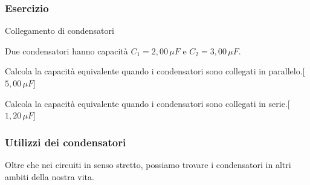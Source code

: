 \documentclass[]{beamer}
\theoremstyle{plain}
\begin{document}
\begin{frame}
\frametitle{Esercizio}
\begin{exampleblock}{Collegamento di condensatori}
  \small{
  Due condensatori hanno capacità $ C_1 = 2,00 \, \mu F $ e $ C_2 = 3,00 \, \mu F $.

  Calcola la capacità equivalente quando i condensatori sono collegati in parallelo.\hspace*{\fill}[$ 5,00 \, \mu F $]
  
  Calcola la capacità equivalente quando i condensatori sono collegati in serie.\hspace*{\fill}[$ 1,20 \, \mu F $]}
\end{exampleblock}
\end{frame}



\begin{frame}
\frametitle{Utilizzi dei condensatori}
Oltre che nei circuiti in senso stretto, possiamo trovare i condensatori in altri ambiti della nostra vita.

~

\begin{columns}
\begin{column}{0.3\textwidth}
\end{column}
\begin{column}{0.3\textwidth}
\end{column}
\begin{column}{0.3\textwidth}
\end{column}
\end{columns}
\end{frame}
\end{document}
